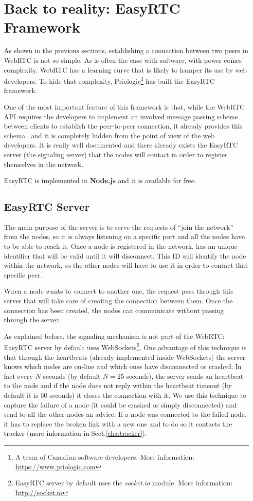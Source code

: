 \section{Back to reality: EasyRTC Framework}
\label{sec:easy_tc}
As shown in the previous sections, establishing a connection between two peers in WebRTC is not so simple.
As is often the case with software, with power comes complexity. WebRTC has a learning curve that is likely to hamper its use by web developers. To hide that complexity, Priologic\footnote{A team of Canadian software developers. More information: \url{https://www.priologic.com}} has built the EasyRTC framework.

One of the most important feature of this framework is that, while the WebRTC API requires the developers to implement an involved message passing scheme between clients to establish the peer-to-peer connection, it already provides this schema~\cite{easyrtc} and it is completely hidden from the point of view of the web developers. It is really well documented and there already exists the EasyRTC server (the signaling server) that the nodes will contact in order to register themselves in the network.

EasyRTC is implemented in \textbf{Node.js} and it is available for free.

\subsection{EasyRTC Server}
\label{subsec:easyrtc_server}

The main purpose of the server is to serve the requests of ``join the network'' from the nodes, so it is always listening on a specific port and all the nodes have to be able to reach it. Once a node is registered in the network, has an unique identifier that will be valid until it will disconnect. This ID will identify the node within the network, so the other nodes will have to use it in order to contact that specific peer. 

When a node wants to connect to another one, the request pass through this server that will take care of creating the connection between them. Once the connection has been created, the nodes can communicate without passing through the server. 

As explained before, the signaling mechanism is not part of the WebRTC: EasyRTC server by default uses WebSockets\footnote{EasyRTC server by default uses the \emph{socket.io} module. More information: \url{http://socket.io}}. One advantage of this technique is that through the heartbeats (already implemented inside WebSockets) the server knows which nodes are on-line and which ones have disconnected or crashed. In fact every $N$ seconds (by default $N = 25$ seconds), the server sends an heartbeat to the node and if the node does not reply within the heartbeat timeout (by default it is 60 seconds) it closes the connection with it. We use this technique to capture the failure of a node (it could be crashed or simply disconnected) and send to all the other nodes an advice. If a node was connected to the failed node, it has to replace the broken link with a new one and to do so it contacts the tracker (more information in Sect.\ref{cha:tracker}).

